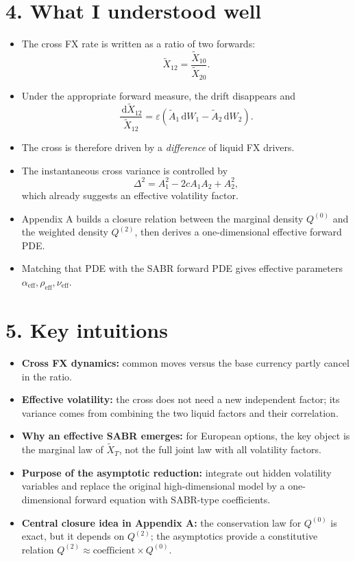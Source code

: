 \documentclass[11pt]{article}
\newcommand{\eps}{\varepsilon}
\newcommand{\dd}{\,\mathrm{d}}
\begin{document}
\section*{4. What I understood well}

\begin{itemize}
    \item The cross FX rate is written as a ratio of two forwards:
    \[
    \widetilde{X}_{12}=\frac{\widetilde{X}_{10}}{\widetilde{X}_{20}}.
    \]
    \item Under the appropriate forward measure, the drift disappears and
    \[
    \frac{\dd \widetilde{X}_{12}}{\widetilde{X}_{12}}
    = \eps\left(\widetilde{A}_1 \dd W_1-\widetilde{A}_2 \dd W_2\right).
    \]
    \item The cross is therefore driven by a \emph{difference} of liquid FX drivers.
    \item The instantaneous cross variance is controlled by
    \[
    \Delta^2 = A_1^2-2cA_1A_2+A_2^2,
    \]
    which already suggests an effective volatility factor.
    \item Appendix A builds a closure relation between the marginal density \(Q^{(0)}\) and the weighted density \(Q^{(2)}\), then derives a one-dimensional effective forward PDE.
    \item Matching that PDE with the SABR forward PDE gives effective parameters \(\alpha_{\mathrm{eff}}, \rho_{\mathrm{eff}}, \nu_{\mathrm{eff}}\).
\end{itemize}

\section*{5. Key intuitions}

\begin{itemize}
    \item \textbf{Cross FX dynamics:} common moves versus the base currency partly cancel in the ratio.
    \item \textbf{Effective volatility:} the cross does not need a new independent factor; its variance comes from combining the two liquid factors and their correlation.
    \item \textbf{Why an effective SABR emerges:} for European options, the key object is the marginal law of \(\widetilde{X}_T\), not the full joint law with all volatility factors.
    \item \textbf{Purpose of the asymptotic reduction:} integrate out hidden volatility variables and replace the original high-dimensional model by a one-dimensional forward equation with SABR-type coefficients.
    \item \textbf{Central closure idea in Appendix A:} the conservation law for \(Q^{(0)}\) is exact, but it depends on \(Q^{(2)}\); the asymptotics provide a constitutive relation \(Q^{(2)} \approx \text{coefficient} \times Q^{(0)}\).
\end{itemize}
\end{document}
